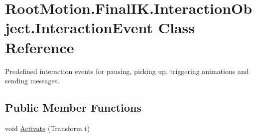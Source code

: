 \hypertarget{class_root_motion_1_1_final_i_k_1_1_interaction_object_1_1_interaction_event}{}\section{Root\+Motion.\+Final\+I\+K.\+Interaction\+Object.\+Interaction\+Event Class Reference}
\label{class_root_motion_1_1_final_i_k_1_1_interaction_object_1_1_interaction_event}


Predefined interaction events for pausing, picking up, triggering animations and sending messages.  


\subsection*{Public Member Functions}
\begin{DoxyCompactItemize}
\item 
void \mbox{\hyperlink{class_root_motion_1_1_final_i_k_1_1_interaction_object_1_1_interaction_event_a5211acc5ffdaa276cf44cae75b7d31bc}{Activate}} (Transform t)
\end{DoxyCompactItemize}
